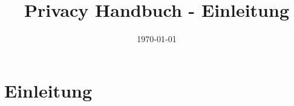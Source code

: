 \documentclass[notitlepage,twoside,a4paper,10pt]{article}
\title{Privacy Handbuch - Einleitung}
\date{\today}
\begin{document}
\tableofcontents

\section{Einleitung}

 
\end{document}
